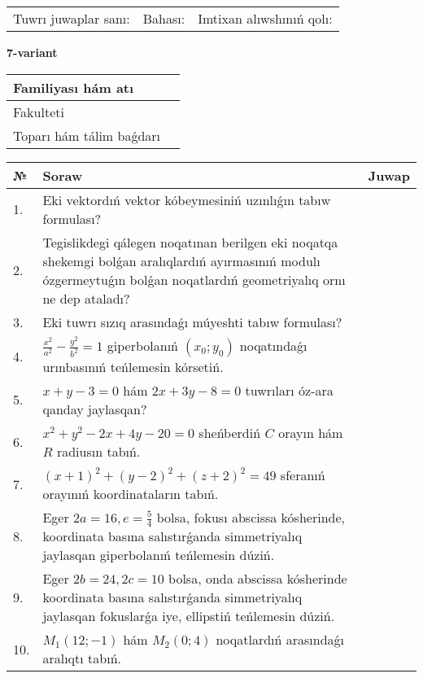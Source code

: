 \documentclass{article}
\begin{document}
\vspace{1cm}

\begin{tabular}{lll}
Tuwrı juwaplar sanı: \underline{\hspace{1.5cm}} & 
Bahası: \underline{\hspace{1.5cm}} & 
Imtixan alıwshınıń qolı: \underline{\hspace{2cm}} \\
\end{tabular}

\egroup

\newpage


\textbf{7-variant}\\

\bgroup
\def\arraystretch{1.6} %

\begin{tabular}{|m{5.7cm}|m{9.5cm}|}
\hline
Familiyası hám atı & \\
\hline
Fakulteti  & \\
\hline
Toparı hám tálim baǵdarı  & \\
\hline
\end{tabular}

\vspace{1cm}

\begin{tabular}{|m{0.7cm}|m{10cm}|m{4cm}|}
\hline
№ & Soraw & Juwap \\
\hline
1. & Eki vektordıń vektor kóbeymesiniń uzınlıǵın tabıw formulası? &  \\
\hline
2. & Tegislikdegi qálegen noqatınan berilgen eki noqatqa shekemgi bolǵan aralıqlardıń ayırmasınıń modulı ózgermeytuǵın bolǵan noqatlardıń geometriyalıq ornı ne dep ataladı? &  \\
\hline
3. & Eki tuwrı sızıq arasındaǵı múyeshti tabıw formulası? &  \\
\hline
4. & $\frac{x^2}{a^2}-\frac{y^2}{b^2}=1$ giperbolanıń $(x_0;y_0)$ noqatındaǵı urınbasınıń teńlemesin kórsetiń. &  \\
\hline
5. & $x+y-3=0$ hám $2x+3y-8=0$ tuwrıları óz-ara qanday jaylasqan? &  \\
\hline
6. & $x^{2}+y^{2}-2x+4y-20=0$ sheńberdiń $C$ orayın hám $R$ radiusın tabıń. &  \\
\hline
7. & $(x+1)^{2}+(y-2) ^{2}+(z+2) ^{2}=49$ sferanıń orayınıń koordinataların tabıń. &  \\
\hline
8. & Eger $2a=16, e=\frac{5}{4}$ bolsa, fokusı abscissa kósherinde, koordinata basına salıstırǵanda simmetriyalıq jaylasqan giperbolanıń teńlemesin dúziń. &  \\
\hline
9. & Eger $2b=24, 2 c=10$ bolsa, onda abscissa kósherinde koordinata basına salıstırǵanda simmetriyalıq jaylasqan fokuslarǵa iye, ellipstiń teńlemesin dúziń. &  \\
\hline
10. & $M_{1} (12;-1)$ hám $M_{2} (0;4)$ noqatlardıń arasındaǵı aralıqtı tabıń. &  \\
\hline
\end{tabular}
\end{document}

